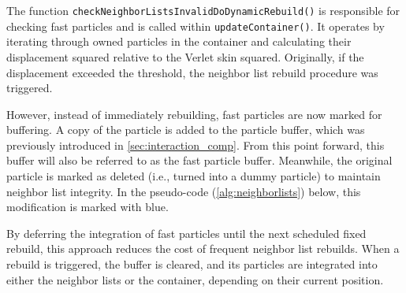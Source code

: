 
The function \texttt{checkNeighborListsInvalidDoDynamicRebuild()} is responsible for 
checking fast particles and is called within \texttt{updateContainer()}. It operates by iterating through owned particles in the container and calculating their displacement squared relative to the Verlet skin squared. Originally, if the displacement exceeded the threshold, the neighbor list rebuild procedure was triggered. 

However, instead of immediately rebuilding, fast particles are now marked for buffering. A copy of the particle is added to the particle buffer, which was previously introduced in \ref{sec:interaction_comp}. From this point forward, this buffer will also be referred to as the fast particle buffer. Meanwhile, the original particle is marked as deleted (i.e., turned into a dummy particle) to maintain neighbor list integrity. In the pseudo-code (\ref{alg:neighborlists}) below, this modification is marked with blue.  

By deferring the integration of fast particles until the next scheduled fixed rebuild, this approach reduces the cost of frequent neighbor list rebuilds. When a rebuild is triggered, the buffer is cleared, and its particles are integrated into either the neighbor lists or the container, depending on their current position.








